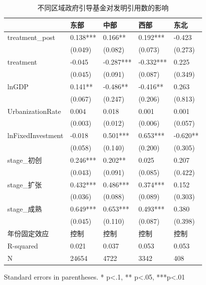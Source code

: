 \begin{table}
\caption{不同区域政府引导基金对发明引用数的影响}
\label{}
\begin{center}
\begin{tabular}{lllll}
\hline
                  & 东部       & 中部        & 西部        & 东北        \\
\hline
treatment\_post   & 0.138*** & 0.166**   & 0.192***  & -0.423    \\
                  & (0.049)  & (0.082)   & (0.073)   & (0.273)   \\
treatment         & -0.045   & -0.287*** & -0.332*** & 0.225     \\
                  & (0.045)  & (0.091)   & (0.087)   & (0.349)   \\
lnGDP             & 0.141**  & -0.486**  & -0.416**  & 0.263     \\
                  & (0.067)  & (0.247)   & (0.206)   & (0.813)   \\
UrbanizationRate              & 0.004    & 0.018     & 0.001     & 0.001     \\
                  & (0.003)  & (0.012)   & (0.006)   & (0.057)   \\
lnFixedInvestment & -0.018   & 0.501***  & 0.653***  & -0.620**  \\
                  & (0.058)  & (0.140)   & (0.200)   & (0.305)   \\
stage\_初创         & 0.246*** & 0.202**   & 0.025     & 0.207     \\
                  & (0.043)  & (0.091)   & (0.085)   & (0.422)   \\
stage\_扩张         & 0.432*** & 0.486***  & 0.374***  & 0.152     \\
                  & (0.036)  & (0.088)   & (0.089)   & (0.303)   \\
stage\_成熟         & 0.649*** & 0.653***  & 0.493***  & 0.380     \\
                  & (0.045)  & (0.110)   & (0.087)   & (0.398)   \\
年份固定效应  & 控制 & 控制 & 控制 & 控制\\ 
\hline

R-squared         & 0.021    & 0.037     & 0.053     & 0.053     \\
N                 & 24654    & 4722      & 3342      & 408       \\
\hline
\end{tabular}
\end{center}
\end{table}
\bigskip
Standard errors in parentheses. \newline 
* p<.1, ** p<.05, ***p<.01

